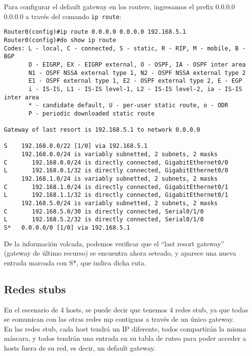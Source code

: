 \documentclass{article}
\begin{document}
Para configurar el default gateway en los routers, ingresamos el prefix 0.0.0.0 0.0.0.0 a trav\'es del comando \texttt{ip route}: \\
\begin{verbatim}
Router0(config)#ip route 0.0.0.0 0.0.0.0 192.168.5.1
Router0(config)#do show ip route
Codes: L - local, C - connected, S - static, R - RIP, M - mobile, B - BGP
       D - EIGRP, EX - EIGRP external, O - OSPF, IA - OSPF inter area
       N1 - OSPF NSSA external type 1, N2 - OSPF NSSA external type 2
       E1 - OSPF external type 1, E2 - OSPF external type 2, E - EGP
       i - IS-IS, L1 - IS-IS level-1, L2 - IS-IS level-2, ia - IS-IS inter area
       * - candidate default, U - per-user static route, o - ODR
       P - periodic downloaded static route

Gateway of last resort is 192.168.5.1 to network 0.0.0.0

S    192.168.0.0/22 [1/0] via 192.168.5.1
     192.168.0.0/24 is variably subnetted, 2 subnets, 2 masks
C       192.168.0.0/24 is directly connected, GigabitEthernet0/0
L       192.168.0.1/32 is directly connected, GigabitEthernet0/0
     192.168.1.0/24 is variably subnetted, 2 subnets, 2 masks
C       192.168.1.0/24 is directly connected, GigabitEthernet0/1
L       192.168.1.1/32 is directly connected, GigabitEthernet0/1
     192.168.5.0/24 is variably subnetted, 2 subnets, 2 masks
C       192.168.5.0/30 is directly connected, Serial0/1/0
L       192.168.5.2/32 is directly connected, Serial0/1/0
S*   0.0.0.0/0 [1/0] via 192.168.5.1

\end{verbatim}

De la informaci\'on volcada, podemos verificar que el ``last resort gateway'' (gateway de \'ultimo recurso) se encuentra ahora seteado, y aparece una nueva entrada marcada con S*, que indica dicha ruta. \\

\subsection{Redes stubs}
En el escenario de 4 hosts, se puede decir que tenemos 4 redes stub, ya que todas se comunican con las otras redes mp contiguas a trav\'es de un \'unico gateway. \\

En las redes stub, cada host tendr\'a un IP diferente, todos compartir\'an la misma m\'ascara, y todos tendr\'an una entrada en su tabla de ruteo para poder acceder a hosts fuera de su red, es decir, un default gateway. \\
\end{document}
